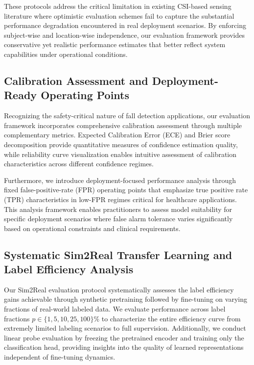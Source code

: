 \documentclass[10pt,conference]{IEEEtran}
\begin{document}
These protocols address the critical limitation in existing CSI-based sensing literature where optimistic evaluation schemes fail to capture the substantial performance degradation encountered in real deployment scenarios. By enforcing subject-wise and location-wise independence, our evaluation framework provides conservative yet realistic performance estimates that better reflect system capabilities under operational conditions.

\subsection{Calibration Assessment and Deployment-Ready Operating Points}

Recognizing the safety-critical nature of fall detection applications, our evaluation framework incorporates comprehensive calibration assessment through multiple complementary metrics. Expected Calibration Error (ECE) and Brier score decomposition provide quantitative measures of confidence estimation quality, while reliability curve visualization enables intuitive assessment of calibration characteristics across different confidence regimes.

Furthermore, we introduce deployment-focused performance analysis through fixed false-positive-rate (FPR) operating points that emphasize true positive rate (TPR) characteristics in low-FPR regimes critical for healthcare applications. This analysis framework enables practitioners to assess model suitability for specific deployment scenarios where false alarm tolerance varies significantly based on operational constraints and clinical requirements.

\subsection{Systematic Sim2Real Transfer Learning and Label Efficiency Analysis}

Our Sim2Real evaluation protocol systematically assesses the label efficiency gains achievable through synthetic pretraining followed by fine-tuning on varying fractions of real-world labeled data. We evaluate performance across label fractions $p \in \{1, 5, 10, 25, 100\}\%$ to characterize the entire efficiency curve from extremely limited labeling scenarios to full supervision. Additionally, we conduct linear probe evaluation by freezing the pretrained encoder and training only the classification head, providing insights into the quality of learned representations independent of fine-tuning dynamics.
\end{document}
